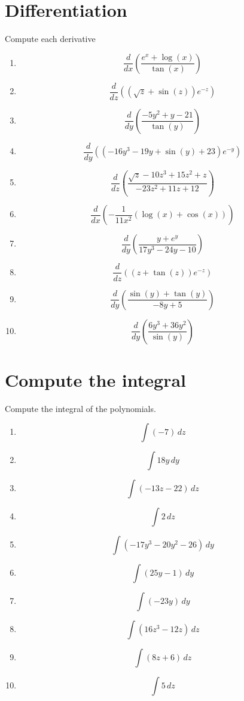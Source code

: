 \documentclass{article}
\begin{document}
        \section{Differentiation}
        Compute each derivative
        \begin{multicols}{1}
        \begin{enumerate}
        \item $$\frac{d}{d x}\left(\frac{e^{x} + \log{\left (x \right )}}{\tan{\left (x \right )}}\right)$$
\item $$\frac{d}{d z}\left(\left(\sqrt{z} + \sin{\left (z \right )}\right) e^{- z}\right)$$
\item $$\frac{d}{d y}\left(\frac{- 5 y^{2} + y - 21}{\tan{\left (y \right )}}\right)$$
\item $$\frac{d}{d y}\left(\left(- 16 y^{3} - 19 y + \sin{\left (y \right )} + 23\right) e^{- y}\right)$$
\item $$\frac{d}{d z}\left(\frac{\sqrt{z} - 10 z^{3} + 15 z^{2} + z}{- 23 z^{2} + 11 z + 12}\right)$$
\item $$\frac{d}{d x}\left(- \frac{1}{11 x^{2}} \left(\log{\left (x \right )} + \cos{\left (x \right )}\right)\right)$$
\item $$\frac{d}{d y}\left(\frac{y + e^{y}}{17 y^{3} - 24 y - 10}\right)$$
\item $$\frac{d}{d z}\left(\left(z + \tan{\left (z \right )}\right) e^{- z}\right)$$
\item $$\frac{d}{d y}\left(\frac{\sin{\left (y \right )} + \tan{\left (y \right )}}{- 8 y + 5}\right)$$
\item $$\frac{d}{d y}\left(\frac{6 y^{3} + 36 y^{2}}{\sin{\left (y \right )}}\right)$$
        \end{enumerate}
        \end{multicols}
        

        \section{Compute the integral}
        Compute the integral of the polynomials.
        \begin{multicols}{1}
        \begin{enumerate}
        \item $$\int \left(-7\right)\, dz$$
\item $$\int 18 y\, dy$$
\item $$\int \left(- 13 z - 22\right)\, dz$$
\item $$\int 2\, dz$$
\item $$\int \left(- 17 y^{3} - 20 y^{2} - 26\right)\, dy$$
\item $$\int \left(25 y - 1\right)\, dy$$
\item $$\int \left(- 23 y\right)\, dy$$
\item $$\int \left(16 z^{3} - 12 z\right)\, dz$$
\item $$\int \left(8 z + 6\right)\, dz$$
\item $$\int 5\, dz$$
        \end{enumerate}
        \end{multicols}
        
\end{document}
